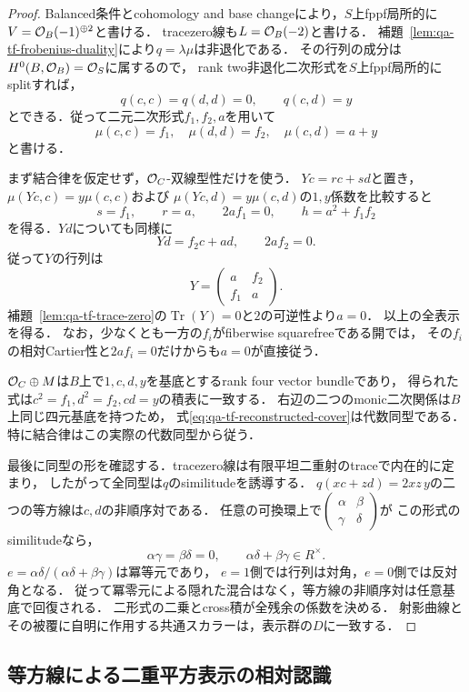 \begin{proof}
Balanced条件とcohomology and base changeにより，$S$上fppf局所的に
$V=\mathcal O_B(-1)^{\oplus2}$と書ける．
tracezero線も$L=\mathcal O_B(-2)$と書ける．
補題~\ref{lem:qa-tf-frobenius-duality}により$q=\lambda\mu$は非退化である．
その行列の成分は$H^0(B,\mathcal O_B)=\mathcal O_S$に属するので，
rank two非退化二次形式を$S$上fppf局所的にsplitすれば，
\[
 q(c,c)=q(d,d)=0,\qquad q(c,d)=y
\]
とできる．従って二元二次形式$f_1,f_2,a$を用いて
\[
 \mu(c,c)=f_1,\quad\mu(d,d)=f_2,
 \quad\mu(c,d)=a+y
\]
と書ける．

まず結合律を仮定せず，$\mathcal O_C$-双線型性だけを使う．
$Yc=r c+s d$と置き，
$\mu(Yc,c)=y\mu(c,c)$および
$\mu(Yc,d)=y\mu(c,d)$の$1,y$係数を比較すると
\[
 s=f_1,\qquad r=a,\qquad 2af_1=0,
 \qquad h=a^2+f_1f_2
\]
を得る．$Yd$についても同様に
\[
 Yd=f_2c+a d,\qquad2af_2=0.
\]
従って$Y$の行列は
\[
                 Y=\begin{pmatrix}a&f_2\\f_1&a\end{pmatrix}.
\]
補題~\ref{lem:qa-tf-trace-zero}の$\operatorname{Tr}(Y)=0$と$2$の可逆性より$a=0$．
以上の全表示を得る．
なお，少なくとも一方の$f_i$がfiberwise squarefreeである開では，
その$f_i$の相対Cartier性と$2af_i=0$だけからも$a=0$が直接従う．

$\mathcal O_C\oplus M$は$B$上で$1,c,d,y$を基底とするrank four vector bundleであり，
得られた式は$c^2=f_1,d^2=f_2,cd=y$の積表に一致する．
右辺の二つのmonic二次関係は$B$上同じ四元基底を持つため，
式\eqref{eq:qa-tf-reconstructed-cover}は代数同型である．
特に結合律はこの実際の代数同型から従う．

最後に同型の形を確認する．tracezero線は有限平坦二重射のtraceで内在的に定まり，
したがって全同型は$q$のsimilitudeを誘導する．
$q(xc+zd)=2xz\,y$の二つの等方線は$c,d$の非順序対である．
任意の可換環上で$\left(\begin{smallmatrix}\alpha&\beta\\\gamma&\delta\end{smallmatrix}\right)$が
この形式のsimilitudeなら，
\[
 \alpha\gamma=\beta\delta=0,
 \qquad\alpha\delta+\beta\gamma\in R^\times.
\]
$e=\alpha\delta/(\alpha\delta+\beta\gamma)$は冪等元であり，
$e=1$側では行列は対角，$e=0$側では反対角となる．
従って冪零元による隠れた混合はなく，等方線の非順序対は任意基底で回復される．
二形式の二乗とcross積が全残余の係数を決める．
射影曲線とその被覆に自明に作用する共通スカラーは，表示群の$D$に一致する．
\end{proof}

\subsection{等方線による二重平方表示の相対認識}
\label{subsec:qa-tf-relative-recognition}

